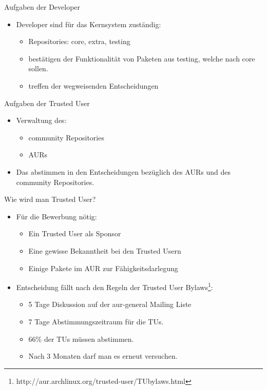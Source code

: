 
\begin{slide}{Aufgaben der Developer}
	\begin{itemize}
		\item{Developer sind f\"{u}r das Kernsystem zust\"{a}ndig:
			\begin{itemize}
				\item{Repositories: core, extra, testing}
				\item{best\"{a}tigen der Funktionalit\"{a}t von Paketen aus testing, welche nach core sollen.}
				\item{treffen der wegweisenden Entscheidungen}
			\end{itemize}
		}
	\end{itemize}
\end{slide}

\begin{slide}{Aufgaben der Trusted User}
	\begin{itemize}
		\item{Verwaltung des:
			\begin{itemize}
				\item{community Repositories}
				\item{AURs}
			\end{itemize}
		}
		\item{Das abstimmen in den Entscheidungen bez\"{u}glich des AURs und des community Repositories.}
	\end{itemize}
\end{slide}

\begin{slide}{Wie wird man Trusted User?}
	\begin{itemize}
		\item{F\"{u}r die Bewerbung n\"{o}tig:
			\begin{itemize}
				\item{Ein Trusted User als Sponsor}
				\item{Eine gewisse Bekanntheit bei den Trusted Usern}
				\item{Einige Pakete im AUR zur F\"{a}higkeitsdarlegung}
			\end{itemize}
		}
		\item{Entscheidung f\"{a}llt nach den Regeln der Trusted User Bylaws\footnote{http://aur.archlinux.org/trusted-user/TUbylaws.html}:
			\begin{itemize}
				\item{5 Tage Diskussion auf der aur-general Mailing Liste}
				\item{7 Tage Abstimmungszeitraum f\"{u}r die TUs.}
				\item{66\% der TUs m\"{u}ssen abstimmen.}
				\item{Nach 3 Monaten darf man es erneut versuchen.}
			\end{itemize}
		}
	\end{itemize}
\end{slide}


